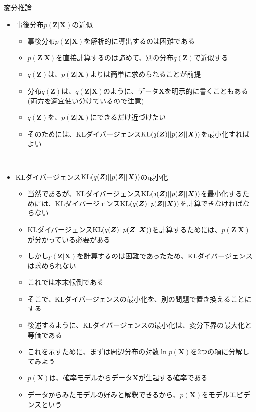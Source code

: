 \documentclass[dvipdfmx,notheorems,t]{beamer}
\begin{document}
\begin{frame}{変分推論}
\begin{itemize}
	\item 事後分布$p(\bm{Z} | \bm{X})$の近似
	\begin{itemize}
		\item 事後分布$p(\bm{Z} | \bm{X})$を解析的に導出するのは困難である
		\item $p(\bm{Z} | \bm{X})$を直接計算するのは諦めて、別の分布$q(\bm{Z})$で近似する
		\item $q(\bm{Z})$は、$p(\bm{Z} | \bm{X})$よりは簡単に求められることが前提
		\newline
		
		\item 分布$q(\bm{Z})$は、$q(\bm{Z} | \bm{X})$のように、データ$\bm{X}$を明示的に書くこともある(\alert{両方を適宜使い分けているので注意})
		\newline
		
		\item $q(\bm{Z})$を、$p(\bm{Z} | \bm{X})$にできるだけ近づけたい
		\item そのためには、\color{red}KLダイバージェンス$\operatorname{KL}(q(\bm{Z}) || p(\bm{Z} || \bm{X}))$を最小化\normalcolor すればよい
	\end{itemize} \
	
	\item KLダイバージェンス$\operatorname{KL}(q(\bm{Z}) || p(\bm{Z} || \bm{X}))$の最小化
	\begin{itemize}
		\item 当然であるが、KLダイバージェンス$\operatorname{KL}(q(\bm{Z}) || p(\bm{Z} || \bm{X}))$を最小化するためには、\alert{KLダイバージェンス$\operatorname{KL}(q(\bm{Z}) || p(\bm{Z} || \bm{X}))$を計算できなければならない}
		\item KLダイバージェンス$\operatorname{KL}(q(\bm{Z}) || p(\bm{Z} || \bm{X}))$を計算するためには、\color{red}$p(\bm{Z} | \bm{X})$が分かっている必要がある\normalcolor
		\item しかし$p(\bm{Z} | \bm{X})$を計算するのは困難であったため、KLダイバージェンスは求められない
		\newline
		\item これでは本末転倒である
		\newline
		\item そこで、KLダイバージェンスの最小化を、\alert{別の問題で置き換える}ことにする
		\item 後述するように、KLダイバージェンスの最小化は、\alert{変分下界の最大化}と等価である
		\newline
		\item これを示すために、まずは周辺分布の対数$\ln p(\bm{X})$を2つの項に分解してみよう
		\item $p(\bm{X})$は、確率モデルからデータ$\bm{X}$が生起する確率である
		\item \alert{データからみたモデルの好み}と解釈できるから、$p(\bm{X})$を\alert{モデルエビデンス}という
	\end{itemize}
\end{itemize}

\end{frame}
\end{document}
